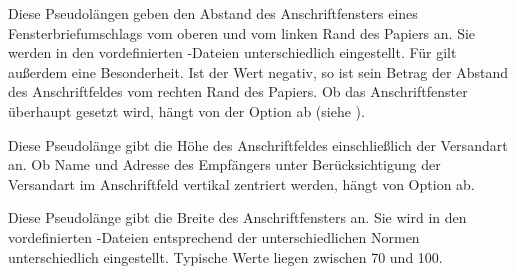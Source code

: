 \begin{Declaration}
\end{Declaration}
Diese Pseudolängen geben den Abstand des Anschriftfensters eines
Fensterbriefumschlags vom oberen und vom linken Rand des Papiers an.  Sie
werden in den vordefinierten
-Dateien
unterschiedlich eingestellt.  Für  gilt außerdem eine
Besonderheit. Ist der Wert negativ, so ist sein Betrag der Abstand des
Anschriftfeldes vom rechten Rand des Papiers. %
 Ob das Anschriftfenster überhaupt gesetzt wird, hängt von der Option
 ab (siehe
).%
\EndIndexGroup


\begin{Declaration}
\end{Declaration}
Diese Pseudolänge gibt die Höhe des Anschriftfeldes einschließlich der
Versandart an. Ob Name und Adresse des Empfängers unter Berücksichtigung der
Versandart im Anschriftfeld vertikal zentriert werden, hängt von Option
 ab.%
\EndIndexGroup


\begin{Declaration}
\end{Declaration}
Diese Pseudolänge gibt die Breite des Anschriftfensters an. Sie wird in den
vordefinierten
-Dateien
entsprechend der unterschiedlichen Normen unterschiedlich
eingestellt. Typische Werte liegen zwischen 70 und 100.

